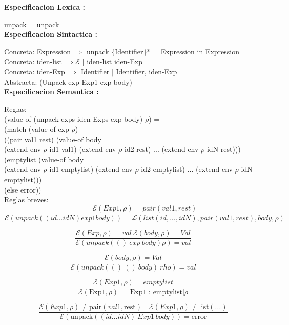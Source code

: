 \documentclass{article}
\begin{document}
\textbf{Especificacion Lexica :} \newline

unpack = unpack \\

\textbf{Especificacion Sintactica :} \newline

Concreta: Expression $\Rightarrow$  unpack \{Identifier\}* = Expression   in Expression \\

Concreta: iden-list $\Rightarrow \mathcal{E}$ $|$ iden-list iden-Exp \\

Concreta: iden-Exp $\Rightarrow$ Identifier $|$ Identifier, iden-Exp \\

Abstracta: (Unpack-exp Exp1 exp body) \\


\textbf{Especificacion Semantica :} \newline

Reglas:\\

(value-of (unpack-exps iden-Exps exp body) $\rho$) = \\
  (match (value-of exp $\rho$) \\
    ((pair val1 rest) (value-of body \\
                        (extend-env $\rho$ id1 val1) (extend-env $\rho$ id2 rest) ... (extend-env $\rho$ idN rest))) \\
    (emptylist (value-of body \\
                        (extend-env $\rho$ id1 emptylist) (extend-env $\rho$ id2 emptylist) ... (extend-env $\rho$ idN emptylist)))\\
    (else error))\\

Reglas breves: \\
$$ 
\frac{\mathcal{E}(Exp1,\rho) = pair(val1,rest)}{\mathcal{E}(unpack((id ... idN) exp1 body)) = \mathcal{L}(list (id,...,idN), pair(val1,rest),body,\rho)}
$$

$$
\frac{\mathcal{E}(Exp,\rho) =val \: \mathcal{E}(body,\rho) =Val}{\mathcal{E}(unpack(() \: exp \: body)\rho) = val}
$$

$$
\frac{\mathcal{E}(body,\rho) =Val}{\mathcal{E}(unpack(() \: () \: body)\    rho) = val}
$$

$$
\frac{\mathcal{E}(Exp1,\rho) = emptylist}{\mathcal{E}(\text{Exp1}, \rho) = \text{[Exp1 : emptylist]}\rho}
$$

$$
\frac{\mathcal{E}(Exp1,\rho) \neq \text{pair}(val1, \text{rest}) \quad \mathcal{E}(Exp1,\rho) \neq \text{list}(...)}{\mathcal{E}(\text{unpack}((id ... idN) \: Exp1 \: body)) = \text{error}}
$$
\end{document}
